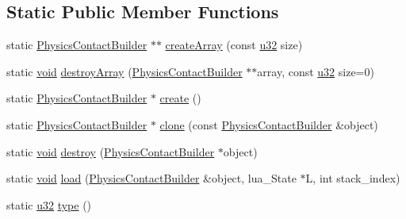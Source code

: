 \subsection*{Static Public Member Functions}
\begin{DoxyCompactItemize}
\item 
static \mbox{\hyperlink{classnjli_1_1_physics_contact_builder}{Physics\+Contact\+Builder}} $\ast$$\ast$ \mbox{\hyperlink{classnjli_1_1_physics_contact_builder_a131af3c4be72ee68c6a93cfd6969d152}{create\+Array}} (const \mbox{\hyperlink{_util_8h_a10e94b422ef0c20dcdec20d31a1f5049}{u32}} size)
\item 
static \mbox{\hyperlink{_thread_8h_af1e856da2e658414cb2456cb6f7ebc66}{void}} \mbox{\hyperlink{classnjli_1_1_physics_contact_builder_aed09aa4931074cf0ee141355e397fabd}{destroy\+Array}} (\mbox{\hyperlink{classnjli_1_1_physics_contact_builder}{Physics\+Contact\+Builder}} $\ast$$\ast$array, const \mbox{\hyperlink{_util_8h_a10e94b422ef0c20dcdec20d31a1f5049}{u32}} size=0)
\item 
static \mbox{\hyperlink{classnjli_1_1_physics_contact_builder}{Physics\+Contact\+Builder}} $\ast$ \mbox{\hyperlink{classnjli_1_1_physics_contact_builder_a3d38cec8ab92913ff95d1d4311d30cff}{create}} ()
\item 
static \mbox{\hyperlink{classnjli_1_1_physics_contact_builder}{Physics\+Contact\+Builder}} $\ast$ \mbox{\hyperlink{classnjli_1_1_physics_contact_builder_a3c138121444b8c66a9c6f5481c4e1ea4}{clone}} (const \mbox{\hyperlink{classnjli_1_1_physics_contact_builder}{Physics\+Contact\+Builder}} \&object)
\item 
static \mbox{\hyperlink{_thread_8h_af1e856da2e658414cb2456cb6f7ebc66}{void}} \mbox{\hyperlink{classnjli_1_1_physics_contact_builder_a710a5f30180c6c5575f9f6330613130b}{destroy}} (\mbox{\hyperlink{classnjli_1_1_physics_contact_builder}{Physics\+Contact\+Builder}} $\ast$object)
\item 
static \mbox{\hyperlink{_thread_8h_af1e856da2e658414cb2456cb6f7ebc66}{void}} \mbox{\hyperlink{classnjli_1_1_physics_contact_builder_a7fa031bfb1fbf0eb748ae3350d9e2012}{load}} (\mbox{\hyperlink{classnjli_1_1_physics_contact_builder}{Physics\+Contact\+Builder}} \&object, lua\+\_\+\+State $\ast$L, int stack\+\_\+index)
\item 
static \mbox{\hyperlink{_util_8h_a10e94b422ef0c20dcdec20d31a1f5049}{u32}} \mbox{\hyperlink{classnjli_1_1_physics_contact_builder_aed94e9c8813e241ef93896673e43dd0e}{type}} ()
\end{DoxyCompactItemize}
